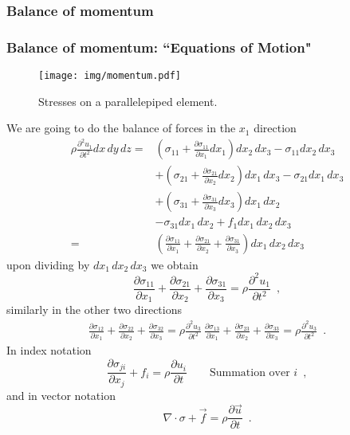 \documentclass{beamer}
\newcommand{\pardiff}[2]{\frac{\partial #1}{\partial #2}}
\newcommand{\pardiffd}[2]{\frac{\partial^2 #1}{\partial #2^2}}
\begin{document}
\subsubsection{Balance of momentum}
\begin{frame}[allowframebreaks]\frametitle{Balance of momentum: ``Equations of Motion"}
\begin{figure}[h]
	\centering
	\texttt{[image: img/momentum.pdf]}
	\caption{Stresses on a parallelepiped element.}
\end{figure}
We are going to do the balance of forces in the $x_1$ direction
\begin{align*}
\rho \pardiffd{u_1}{t} dx\, dy\, dz =& \left(\sigma_{11} + \pardiff{\sigma_{11}}{x_1}dx_1\right)dx_2\, dx_3 - \sigma_{11} dx_2\, dx_3\\
&+ \left(\sigma_{21} + \pardiff{\sigma_{21}}{x_2}dx_2\right)dx_1\, dx_3
 -\sigma_{21}dx_1\, dx_3\\
&+ \left(\sigma_{31} + \pardiff{\sigma_{31}}{x_3}dx_3\right)dx_1\, dx_2\\
&- \sigma_{31}dx_1\, dx_2 + f_1 dx_1\, dx_2\, dx_3 \\
=& \left(\pardiff{\sigma_{11}}{x_1} + \pardiff{\sigma_{21}}{x_2} + \pardiff{\sigma_{31}}{x_3}\right)dx_1\, dx_2\, dx_3
\end{align*}
upon dividing by $dx_1\, dx_2\, dx_3$ we obtain
\[\pardiff{\sigma_{11}}{x_1} + \pardiff{\sigma_{21}}{x_2} + \pardiff{\sigma_{31}}{x_3} = \rho \pardiffd{u_1}{t} \enspace ,\]
similarly in the other two directions
\begin{align*}
\pardiff{\sigma_{12}}{x_1} + \pardiff{\sigma_{22}}{x_2} + \pardiff{\sigma_{32}}{x_3} = \rho \pardiffd{u_3}{t} \
\pardiff{\sigma_{13}}{x_1} + \pardiff{\sigma_{23}}{x_2} + \pardiff{\sigma_{33}}{x_3} = \rho \pardiffd{u_3}{t} \enspace .
\end{align*}
In index notation
\[\pardiff{\sigma_{ji}}{x_j} + f_i = \rho\pardiff{u_i}{t}\qquad \text{Summation over } i \enspace ,\]
and in vector notation
\[\nabla\cdot \sigma + \vec{f} = \rho \pardiff{\vec{u}}{t} \enspace .\]
\end{frame}
\end{document}
